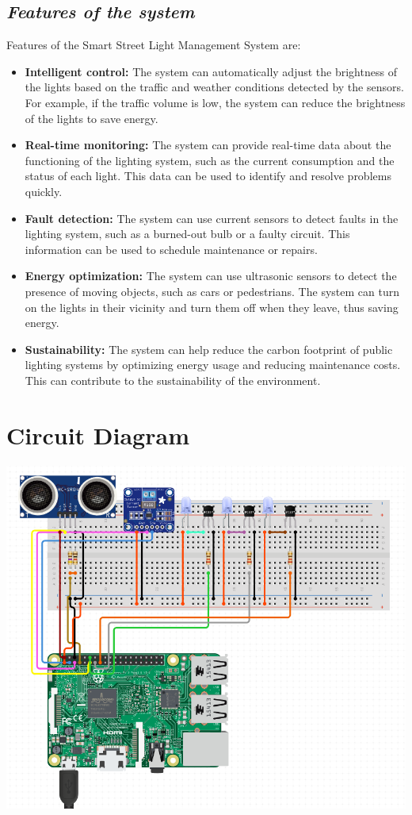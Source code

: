 \documentclass{article}
\begin{document}
\subsection{\textit{Features of the system}}
Features of the Smart Street Light Management System are:
\begin{itemize}
    \item \textbf{Intelligent control:} The system can automatically adjust the brightness of the lights based on the traffic and weather conditions detected by the sensors. For example, if the traffic volume is low, the system can reduce the brightness of the lights to save energy.
    \item \textbf{Real-time monitoring:} The system can provide real-time data about the functioning of the lighting system, such as the current consumption and the status of each light. This data can be used to identify and resolve problems quickly.
    \item \textbf{Fault detection:} The system can use current sensors to detect faults in the lighting system, such as a burned-out bulb or a faulty circuit. This information can be used to schedule maintenance or repairs.
    \item \textbf{Energy optimization:} The system can use ultrasonic sensors to detect the presence of moving objects, such as cars or pedestrians. The system can turn on the lights in their vicinity and turn them off when they leave, thus saving energy.
    \item \textbf{Sustainability:} The system can help reduce the carbon footprint of public lighting systems by optimizing energy usage and reducing maintenance costs. This can contribute to the sustainability of the environment.
\end{itemize}
\section{\textbf{Circuit Diagram}}
\begin{center}
    \includegraphics*[scale = 0.6]{Circuit_Diagram.png}
\end{center}
\end{document}
